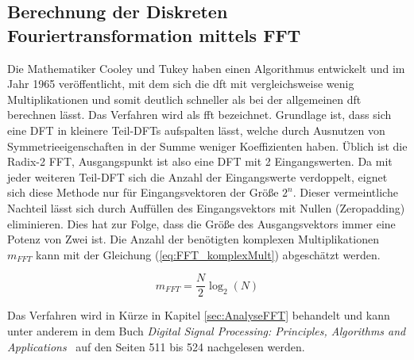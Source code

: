 \subsection{Berechnung der Diskreten Fouriertransformation mittels FFT}\label{sec:BerechnungFFT}
Die Mathematiker Cooley und Tukey haben einen Algorithmus entwickelt und im Jahr 1965 veröffentlicht, mit dem sich die \gls{dft} mit vergleichsweise wenig Multiplikationen
und somit deutlich schneller als bei der allgemeinen \gls{dft} berechnen lässt. Das Verfahren wird als \gls{fft} bezeichnet.
Grundlage ist, dass sich eine DFT
in kleinere Teil-DFTs aufspalten lässt, welche durch Ausnutzen von Symmetrieeigenschaften in der Summe weniger Koeffizienten haben. 
Üblich ist die Radix-2 FFT, Ausgangspunkt ist also eine DFT mit 2 Eingangswerten.
Da mit jeder weiteren Teil-DFT sich die Anzahl der Eingangswerte verdoppelt, eignet sich diese Methode nur für Eingangsvektoren der Größe $2^n$. Dieser
vermeintliche Nachteil lässt sich durch Auffüllen des Eingangsvektors mit Nullen (Zeropadding) eliminieren. Dies hat zur Folge, dass die Größe des Ausgangsvektors
immer eine Potenz von Zwei ist. 
Die Anzahl der benötigten komplexen Multiplikationen $m_{FFT}$ kann mit der Gleichung (\ref{eq:FFT_komplexMult}) abgeschätzt werden.


\begin{equation}\label{eq:FFT_komplexMult}
 m_{FFT} = \frac{N}{2}\log_2(N)
\end{equation}



Das Verfahren wird in Kürze in Kapitel \ref{sec:AnalyseFFT} behandelt und kann unter anderem in dem Buch 
\textit{Digital Signal Processing: Principles, Algorithms and Applications}~\autocite{john2007digital} auf den Seiten 511 bis 524 nachgelesen werden.
